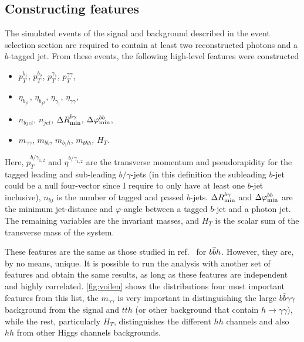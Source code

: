 \subsection{Constructing features \label{constructingfeat}}
\par The simulated events of the signal and background described in the event selection section are required to contain at least two reconstructed photons and  a $b$-tagged jet. From these events, the following high-level features were constructed
\begin{itemize}
	\setlength{\itemsep}{0pt}
	\item $p_T^{b_1}$, $p_T^{b_2}$, $p_T^{\gamma_1}$, $p_T^{\gamma\gamma}$, 
	\item $\eta_{b_{j1}}$, $\eta_{b_{j2}}$, $\eta_{\gamma_1}$, $\eta_{\gamma\gamma}$,
	\item $n_{bjet}$, $n_{jet}$, $\Delta R_{\rm min}^{b\gamma}$, $\Delta \varphi_{\rm min}^{bb}$, 
	\item $m_{\gamma\gamma}$, $m_{bb}$, $m_{b_{1} h}$, $m_{b\bar b h}$, $H_T$.
\end{itemize}
Here, $p_T^{{b/\gamma}_{1,2}}$ and $\eta^{{b/\gamma}_{1,2}}$ are the transverse momentum and pseudorapidity for the tagged leading and sub-leading $b/\gamma$-jets (in this definition the subleading $b$-jet could be a null four-vector since I require to only have at least one $b$-jet inclusive), $n_{bj}$ is the number of tagged and passed $b$-jets. $\Delta R_{\rm min}^{b\gamma}$ and $\Delta \varphi_{\rm min}^{bb}$ are the minimum jet-distance and $\varphi$-angle between a tagged $b$-jet and a photon jet. The remaining variables are the invariant masses, and $H_T$ is the scalar sum of the transverse mass of the system. 
\par  These features are the same as those studied in ref.~\cite{Grojean:2020ech} for $b\overline bh$. However, they are, by no means, unique. It is possible to run the analysis with another set of features and obtain the same results, as long as these features are independent and highly correlated. \autoref{fig:voilen} shows the distributions four most important features from this list, the $m_{\gamma \gamma}$ is very important in distinguishing the large $b \bar b \gamma \gamma$ background from the signal and $ t\bar t h$ (or other background that contain $ h \to \gamma \gamma$), while the rest, particularly $ H_T$, distinguishes the different $hh$ channels and also $hh$ from other Higgs channels backgrounds.  
